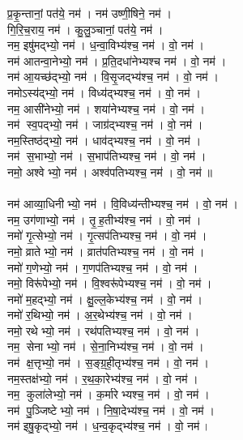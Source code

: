प्र॒कृ॒न्तानां॒ पत॑ये॒ नम॑। नम॑ उष्णी॒षिने॒ नम॑। \\
गि॒रि॒च॒राय॒ नम॑। कु॒लु॒ञ्चानां॒ पत॑ये॒  नम॑। \\
नम॒ इषु॑मद्भ्यो॒  नम॑। ध॒न्वा॒विभ्य॑श्च॒  नम॑। वो॒  नम॑। \\
नम॑ आतन्वा॒नेभ्यो॒ नम॑। प्र॒ति॒दधा॑नेभ्यश्च  नम॑। वो॒ नम॑।\\
नम॑ आ॒यच्छ॑द्भ्यो॒  नम॑।  वि॒सृ॒जद्भ्य॑श्च॒  नम॑।  वो॒ नम॑।\\
नमोऽस्य॑द्भ्यो॒  नम॑। विध्य॑द्भ्यश्च॒  नम॑।  वो॒ नम॑।\\
नम॒ आसी॑नेभ्यो॒  नम॑। शया॑नेभ्यश्च॒  नम॑। वो॒ नम॑।\\
नम॑ स्व॒पद्भ्यो॒  नम॑। जाग्र॑द्भ्यश्च॒  नम॑।  वो॒ नम॑।\\
नम॒स्तिष्ठ॑द्भ्यो॒  नम॑। धाव॑द्भ्यश्च॒  नम॑।  वो॒ नम॑।\\
नम॑ स॒भाभ्यो॒  नम॑। स॒भाप॑तिभ्यश्च॒ नम॑। वो॒ नम॑।\\
नमो॒ अश्वेभ्यो॒  नम॑। अश्व॑पतिभ्यश्च॒  नम॑। वो॒ नम॑॥\\
\\
नम॑ आव्या॒धिनीभ्यो॒  नम॑। वि॒विध्य॑न्तीभ्यश्च॒  नम॑।  वो॒ नम॑। \\
नम॒ उग॑णाभ्यो॒ नम॑। तृ॒ह॒तीभ्य॑श्च॒ नम॑। वो॒ नम॑। \\
नमो॑ गृ॒त्सेभ्यो॒ नम॑। गृ॒त्सप॑तिभ्यश्च॒ नम॑। वो॒ नम॑। \\
नमो॒ व्रातेभ्यो॒ नम॑। व्रात॑पतिभ्यश्च॒ नम॑। वो॒ नम॑। \\
नमो॑ ग॒णेभ्यो॒ नम॑। ग॒णप॑तिभ्यश्च॒ नम॑। वो॒ नम॑।\\
नमो॒ विरू॑पेभ्यो॒ नम॑। वि॒श्वरू॑पेभ्यश्च॒ नम॑। वो॒ नम॑। \\
नमो॑ म॒हद्भ्यो॒ नम॑। क्षु॒ल्ल॒केभ्य॑श्च॒ नम॑। वो॒ नम॑।\\
नमो॑ र॒थिभ्यो॒ नम॑। अ॒र॒थेभ्य॑श्च॒ नम॑। वो॒ नम॑। \\
नमो॒ रथेभ्यो॒ नम॑। रथ॑पतिभ्यश्च॒ नम॑। वो॒ नम॑।\\
नम॒ सेनाभ्यो॒ नम॑। से॒ना॒निभ्य॑श्च॒ नम॑। वो॒ नम॑। \\
नम॑ क्ष॒त्तृभ्यो॒ नम॑। स॒ङ्ग्र॒ही॒तृभ्य॑श्च॒ नम॑। वो॒ नम॑। \\
नम॒स्तक्ष॑भ्यो॒ नम॑। र॒थ॒का॒रेभ्य॑श्च॒ नम॑। वो॒ नम॑। \\
नम॒ कुला॑लेभ्यो॒ नम॑। क॒र्मारेभ्यश्च॒ नम॑। वो॒ नम॑। \\
नम॑ पु॒ञ्जिष्टेभ्यो॒ नम॑। नि॒षा॒देभ्य॑श्च॒ नम॑। वो॒ नम॑। \\
नम॑ इषु॒कृद्भ्यो॒ नम॑। ध॒न्व॒कृद्भ्य॑श्च॒ नम॑। वो॒ नम॑।\\
